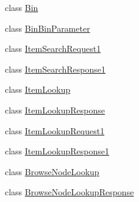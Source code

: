 \begin{DoxyCompactItemize}
\begin{DoxyCompactList}\small\item\em \end{DoxyCompactList}\item 
class \hyperlink{class_price___comparison_1_1amazon_1_1ecs_1_1_bin}{Bin}
\begin{DoxyCompactList}\small\item\em \end{DoxyCompactList}\item 
class \hyperlink{class_price___comparison_1_1amazon_1_1ecs_1_1_bin_bin_parameter}{Bin\-Bin\-Parameter}
\begin{DoxyCompactList}\small\item\em \end{DoxyCompactList}\item 
class \hyperlink{class_price___comparison_1_1amazon_1_1ecs_1_1_item_search_request1}{Item\-Search\-Request1}
\item 
class \hyperlink{class_price___comparison_1_1amazon_1_1ecs_1_1_item_search_response1}{Item\-Search\-Response1}
\item 
class \hyperlink{class_price___comparison_1_1amazon_1_1ecs_1_1_item_lookup}{Item\-Lookup}
\begin{DoxyCompactList}\small\item\em \end{DoxyCompactList}\item 
class \hyperlink{class_price___comparison_1_1amazon_1_1ecs_1_1_item_lookup_response}{Item\-Lookup\-Response}
\begin{DoxyCompactList}\small\item\em \end{DoxyCompactList}\item 
class \hyperlink{class_price___comparison_1_1amazon_1_1ecs_1_1_item_lookup_request1}{Item\-Lookup\-Request1}
\item 
class \hyperlink{class_price___comparison_1_1amazon_1_1ecs_1_1_item_lookup_response1}{Item\-Lookup\-Response1}
\item 
class \hyperlink{class_price___comparison_1_1amazon_1_1ecs_1_1_browse_node_lookup}{Browse\-Node\-Lookup}
\begin{DoxyCompactList}\small\item\em \end{DoxyCompactList}\item 
class \hyperlink{class_price___comparison_1_1amazon_1_1ecs_1_1_browse_node_lookup_response}{Browse\-Node\-Lookup\-Response}
\begin{DoxyCompactList}\small\item\em \end{DoxyCompactList}\item 

\end{DoxyCompactItemize}
